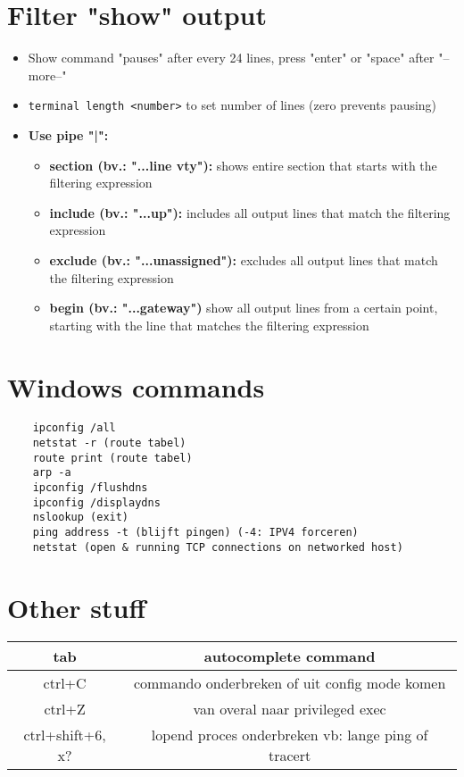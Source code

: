 \documentclass[10pt, a4paper]{article}
\begin{document}
	\section{Filter "show" output}
	\begin{itemize}[noitemsep,nolistsep]
		\item Show command "pauses" after every 24 lines, press "enter" or "space" after "--more--"
		\item \texttt{terminal length <number>} to set number of lines (zero prevents pausing)\\
		\item \textbf{Use pipe "|":}
		\begin{itemize}[noitemsep,nolistsep]
			\item \textbf{section (bv.: "...line vty"):} shows entire section that starts with the filtering expression
			\item \textbf{include (bv.: "...up"):} includes all output lines that match the filtering expression
			\item \textbf{exclude (bv.: "...unassigned"):} excludes all output lines that match the filtering expression
			\item \textbf{begin (bv.: "...gateway")} show all output lines from a certain point, starting with the line that matches the filtering expression\\
		\end{itemize}
	\end{itemize}

	\section{Windows commands}
	\begin{lstlisting}
	ipconfig /all
	netstat -r (route tabel)
	route print (route tabel)
	arp -a
	ipconfig /flushdns
	ipconfig /displaydns
	nslookup (exit)
	ping address -t (blijft pingen) (-4: IPV4 forceren)
	netstat (open & running TCP connections on networked host)
	\end{lstlisting}

	\section{Other stuff}
	\begin{tabular}{|c|c|}
		\hline \rule[-1ex]{0pt}{4ex} tab & autocomplete command \\
		\hline \rule[-1ex]{0pt}{4ex} ctrl+C  & commando onderbreken  of uit config mode komen\\
		\hline \rule[-1ex]{0pt}{4ex} ctrl+Z & van overal naar privileged exec\\
		\hline \rule[-1ex]{0pt}{4ex} ctrl+shift+6, x? & lopend proces onderbreken vb: lange ping of tracert\\
		\hline
	\end{tabular} \\ \\
\end{document}
